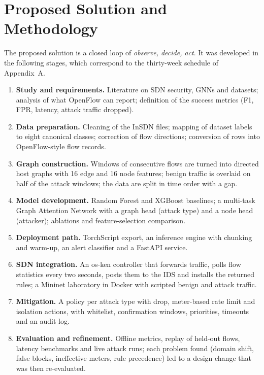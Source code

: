 \section{Proposed Solution and Methodology}
The proposed solution is a closed loop of \emph{observe, decide, act}. It was developed in the following stages, which correspond to the thirty-week schedule of Appendix~A.
\begin{enumerate}
	\item \textbf{Study and requirements.} Literature on SDN security, GNNs and datasets; analysis of what OpenFlow can report; definition of the success metrics (F1, FPR, latency, attack traffic dropped).
	\item \textbf{Data preparation.} Cleaning of the InSDN files; mapping of dataset labels to eight canonical classes; correction of flow directions; conversion of rows into OpenFlow-style flow records.
	\item \textbf{Graph construction.} Windows of consecutive flows are turned into directed host graphs with 16 edge and 16 node features; benign traffic is overlaid on half of the attack windows; the data are split in time order with a gap.
	\item \textbf{Model development.} Random Forest and XGBoost baselines; a multi-task Graph Attention Network with a graph head (attack type) and a node head (attacker); ablations and feature-selection comparison.
	\item \textbf{Deployment path.} TorchScript export, an inference engine with chunking and warm-up, an alert classifier and a FastAPI service.
	\item \textbf{SDN integration.} An os-ken controller that forwards traffic, polls flow statistics every two seconds, posts them to the IDS and installs the returned rules; a Mininet laboratory in Docker with scripted benign and attack traffic.
	\item \textbf{Mitigation.} A policy per attack type with drop, meter-based rate limit and isolation actions, with whitelist, confirmation windows, priorities, timeouts and an audit log.
	\item \textbf{Evaluation and refinement.} Offline metrics, replay of held-out flows, latency benchmarks and live attack runs; each problem found (domain shift, false blocks, ineffective meters, rule precedence) led to a design change that was then re-evaluated.
\end{enumerate}

